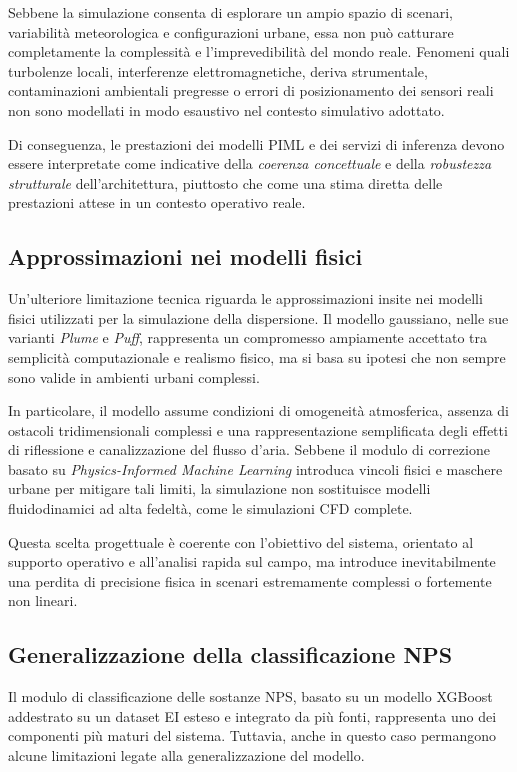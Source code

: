 Sebbene la simulazione consenta di esplorare un ampio spazio di scenari, variabilità meteorologica e configurazioni urbane, essa non può catturare completamente la complessità e l’imprevedibilità del mondo reale.
Fenomeni quali turbolenze locali, interferenze elettromagnetiche, deriva strumentale, contaminazioni ambientali pregresse o errori di posizionamento dei sensori reali non sono modellati in modo esaustivo nel contesto simulativo adottato.

Di conseguenza, le prestazioni dei modelli PIML e dei servizi di inferenza devono essere interpretate come indicative della \emph{coerenza concettuale} e della \emph{robustezza strutturale} dell’architettura, piuttosto che come una stima diretta delle prestazioni attese in un contesto operativo reale.

\subsection{Approssimazioni nei modelli fisici}

Un’ulteriore limitazione tecnica riguarda le approssimazioni insite nei modelli fisici utilizzati per la simulazione della dispersione.
Il modello gaussiano, nelle sue varianti \textit{Plume} e \textit{Puff}, rappresenta un compromesso ampiamente accettato tra semplicità computazionale e realismo fisico, ma si basa su ipotesi che non sempre sono valide in ambienti urbani complessi.

In particolare, il modello assume condizioni di omogeneità atmosferica, assenza di ostacoli tridimensionali complessi e una rappresentazione semplificata degli effetti di riflessione e canalizzazione del flusso d’aria.
Sebbene il modulo di correzione basato su \textit{Physics-Informed Machine Learning} introduca vincoli fisici e maschere urbane per mitigare tali limiti, la simulazione non sostituisce modelli fluidodinamici ad alta fedeltà, come le simulazioni CFD complete.

Questa scelta progettuale è coerente con l’obiettivo del sistema, orientato al supporto operativo e all’analisi rapida sul campo, ma introduce inevitabilmente una perdita di precisione fisica in scenari estremamente complessi o fortemente non lineari.

\subsection{Generalizzazione della classificazione NPS}

Il modulo di classificazione delle sostanze NPS, basato su un modello XGBoost addestrato su un dataset EI esteso e integrato da più fonti, rappresenta uno dei componenti più maturi del sistema.
Tuttavia, anche in questo caso permangono alcune limitazioni legate alla generalizzazione del modello.

